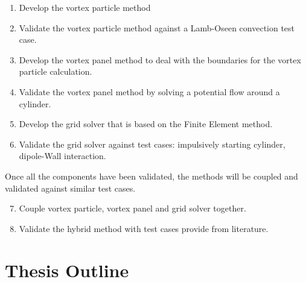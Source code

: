 	\begin{enumerate}
	\item Develop the vortex particle method
	\item Validate the vortex particle method against a Lamb-Oseen convection test case.
	\item Develop the vortex panel method to deal with the boundaries for the vortex particle calculation. 
	\item Validate the vortex panel method by solving a potential flow around a cylinder.
	\item Develop the grid solver that is based on the Finite Element method. 
	\item Validate the grid solver against test cases: impulsively starting cylinder, dipole-Wall interaction.
	\end{enumerate}

Once all the components have been validated, the methods will be coupled and validated against similar test cases.

	\begin{enumerate}
	\setcounter{enumi}{6}
	\item Couple vortex particle, vortex panel and grid solver together.
	\item Validate the hybrid method with test cases provide from literature.
	\end{enumerate}


\section{Thesis Outline}


%
%
%
%

